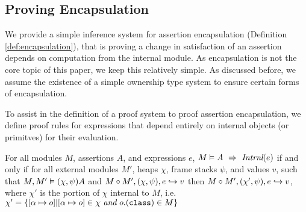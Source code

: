 

\subsection{Proving Encapsulation}
\label{s:encap-proof}

We provide a simple inference system for assertion encapsulation (Definition \ref{def:encapsulation}),
that is proving a change in satisfaction of an assertion depends on computation from the internal module. 
As encapsulation is not the core topic of this paper, we keep this relatively simple. As discussed before, 
we assume the existence of a simple ownership type system to ensure certain forms of encapsulation.

To assist in the definition of a proof system to proof assertion encapsulation,
we define proof rules for expressions that depend entirely on internal objects (or primitves)
for their evaluation.
\begin{definition}
For all modules $M$, assertions $A$, and expressions $e$, 
$M \vDash A\ \Rightarrow\ \textit{Intrnl}(e)$ if and only if for all external modules 
$M'$, heaps $\chi$, frame stacks $\psi$, and values $v$,
such that $M , M' \vDash (\chi, \psi){A}$ and
$M \circ M', (\chi, \psi), e \hookrightarrow v$
then 
$M \circ M', (\chi', \psi), e \hookrightarrow v$, 
where $\chi'$ is the portion of $\chi$ internal to $M$, i.e. 
$\chi' = \{[\alpha \mapsto o]| [\alpha \mapsto o] \in \chi\ \textit{and}\ o.({\texttt{class}}) \in M \}$
\end{definition}


